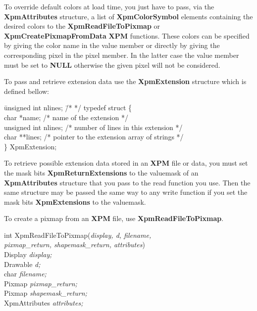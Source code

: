 To override default colors at load time, you just have to pass, via the {\bf
XpmAttributes} structure, a list of {\bf XpmColorSymbol} elements containing
the desired colors to the {\bf XpmReadFileToPixmap} or {\bf
XpmCreatePixmapFromData} {\bf XPM} functions. These colors can be specified by
giving the color name in the value member or directly by giving the
corresponding pixel in the pixel member. In the latter case the value member
must be set to {\bf NULL} otherwise the given pixel will not be considered.

\vspace{.5cm}
To pass and retrieve extension data use the {\bf XpmExtension} structure which
is defined bellow:

\begin{tabbing}
\hspace{1cm}\= unsigned int nlines; \hspace{1cm}\= /*  */ \kill
typedef struct \{ \\
\> char *name;		\> /* name of the extension */ \\
\> unsigned int nlines;	\> /* number of lines in this extension */ \\
\> char **lines;	\> /* pointer to the extension array of strings */ \\
\}      XpmExtension;
\end{tabbing}

To retrieve possible extension data stored in an {\bf XPM} file or data, you
must set the mask bits {\bf XpmReturnExtensions} to the valuemask of an {\bf
XpmAttributes} structure that you pass to the read function you use. Then the
same structure may be passed the same way to any write function if you set the
mask bits {\bf XpmExtensions} to the valuemask.

\vspace{.5cm}
To create a pixmap from an {\bf XPM} file, use {\bf XpmReadFileToPixmap}.

\begin{flushleft} 

int XpmReadFileToPixmap({\it display, d, filename, \\
\hspace{3cm}pixmap\_return, shapemask\_return, attributes})\\

\hspace{1cm}Display {\it *display;}\\
\hspace{1cm}Drawable {\it d;}\\
\hspace{1cm}char {\it *filename;}\\
\hspace{1cm}Pixmap {\it *pixmap\_return;}\\
\hspace{1cm}Pixmap {\it *shapemask\_return;}\\
\hspace{1cm}XpmAttributes {\it *attributes;}

\end{flushleft}

